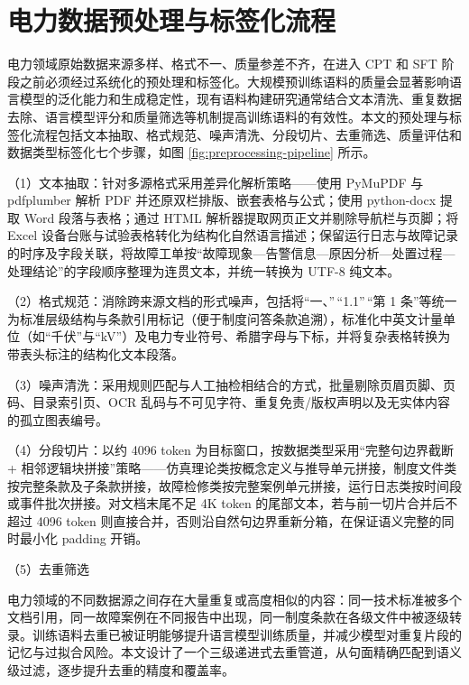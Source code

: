 \documentclass[fontset=fandol,type=master,campus=shenzhen,etitleauto=true]{hithesisbook}
\begin{document}
\section{电力数据预处理与标签化流程}\label{sec:preprocess}

电力领域原始数据来源多样、格式不一、质量参差不齐，在进入 CPT 和 SFT 阶段之前必须经过系统化的预处理和标签化。大规模预训练语料的质量会显著影响语言模型的泛化能力和生成稳定性，现有语料构建研究通常结合文本清洗、重复数据去除、语言模型评分和质量筛选等机制提高训练语料的有效性\cite{ref56,ref57,ref58}。本文的预处理与标签化流程包括文本抽取、格式规范、噪声清洗、分段切片、去重筛选、质量评估和数据类型标签化七个步骤，如图 \ref{fig:preprocessing-pipeline} 所示。

\noindent （1）文本抽取：针对多源格式采用差异化解析策略——使用 PyMuPDF 与 pdfplumber 解析 PDF 并还原双栏排版、嵌套表格与公式；使用 python-docx 提取 Word 段落与表格；通过 HTML 解析器提取网页正文并剔除导航栏与页脚；将 Excel 设备台账与试验表格转化为结构化自然语言描述；保留运行日志与故障记录的时序及字段关联，将故障工单按“故障现象—告警信息—原因分析—处置过程—处理结论”的字段顺序整理为连贯文本，并统一转换为 UTF-8 纯文本。

\noindent （2）格式规范：消除跨来源文档的形式噪声，包括将``一、''\,``1.1''\,``第 1 条''等统一为标准层级结构与条款引用标记（便于制度问答条款追溯），标准化中英文计量单位（如``千伏''与``kV''）及电力专业符号、希腊字母与下标，并将复杂表格转换为带表头标注的结构化文本段落。

\noindent （3）噪声清洗：采用规则匹配与人工抽检相结合的方式，批量剔除页眉页脚、页码、目录索引页、OCR 乱码与不可见字符、重复免责/版权声明以及无实体内容的孤立图表编号。

\noindent （4）分段切片：以约 4096 token 为目标窗口，按数据类型采用``完整句边界截断 + 相邻逻辑块拼接''策略——仿真理论类按概念定义与推导单元拼接，制度文件类按完整条款及子条款拼接，故障检修类按完整案例单元拼接，运行日志类按时间段或事件批次拼接。对文档末尾不足 4K token 的尾部文本，若与前一切片合并后不超过 4096 token 则直接合并，否则沿自然句边界重新分箱，在保证语义完整的同时最小化 padding 开销。

\noindent （5）去重筛选

电力领域的不同数据源之间存在大量重复或高度相似的内容：同一技术标准被多个文档引用，同一故障案例在不同报告中出现，同一制度条款在各级文件中被逐级转录。训练语料去重已被证明能够提升语言模型训练质量，并减少模型对重复片段的记忆与过拟合风险\cite{ref57}。本文设计了一个三级递进式去重管道，从句面精确匹配到语义级过滤，逐步提升去重的精度和覆盖率。
\end{document}
